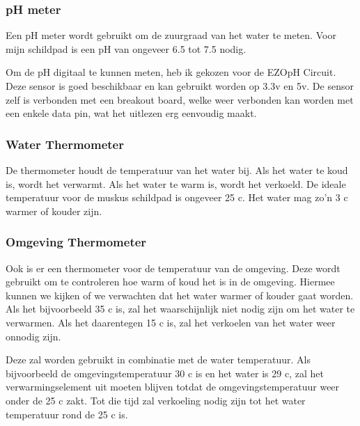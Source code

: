 \documentclass[a4paper]{report}
\begin{document}
\subsubsection{pH meter}
Een pH meter wordt gebruikt om de zuurgraad van het water te meten. 
Voor mijn schildpad is een pH van ongeveer 6.5 tot 7.5 nodig. 

Om de pH digitaal te kunnen meten, heb ik gekozen voor de  EZO\texttrademark \space pH Circuit. 
Deze sensor is goed beschikbaar en kan gebruikt worden op 3.3v en 5v. De sensor zelf is verbonden met een breakout board, welke weer verbonden kan worden met een enkele data pin, wat het uitlezen erg eenvoudig maakt.


\subsubsection{Water Thermometer}
De thermometer houdt de temperatuur van het water bij. Als het water te koud is, wordt het verwarmt. Als het water te warm is, wordt het verkoeld.
De ideale temperatuur voor de muskus schildpad is ongeveer 25 \textdegree c. Het water mag zo'n 3 \textdegree c warmer of kouder zijn.

\subsubsection{Omgeving Thermometer}
Ook is er een thermometer voor de temperatuur van de omgeving. Deze wordt gebruikt om te controleren hoe warm of koud het is in de omgeving. Hiermee kunnen we kijken of we verwachten dat het water warmer of kouder gaat worden.
Als het bijvoorbeeld 35 \textdegree c is, zal het waarschijnlijk niet nodig zijn om het water te verwarmen. Als het daarentegen 15 \textdegree c is, zal het verkoelen van het water weer onnodig zijn.

Deze zal worden gebruikt in combinatie met de water temperatuur. Als bijvoorbeeld de omgevingstemperatuur 30 \textdegree c is en het water is 29 \textdegree c, zal het verwarmingselement uit moeten blijven totdat de omgevingstemperatuur weer onder de 25 \textdegree c zakt. Tot die tijd zal verkoeling nodig zijn tot het water temperatuur rond de 25 \textdegree c is.
\end{document}

